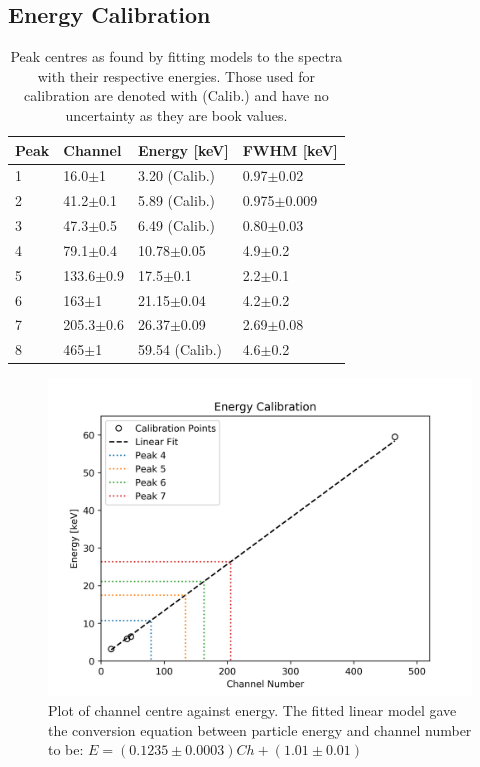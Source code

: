 \subsection{Energy Calibration}

\begin{table}[H]
    \begin{tabular}{llll}
    \hline \hline
    Peak & Channel  & Energy [keV] & FWHM [keV]  \\ \hline
    1    & 16.0$\pm$1    & 3.20 (Calib.)          & 0.97$\pm$0.02   \\
    2    & 41.2$\pm$0.1  & 5.89 (Calib.)        & 0.975$\pm$0.009 \\
    3    & 47.3$\pm$0.5  & 6.49 (Calib.)        & 0.80$\pm$0.03   \\
    4    & 79.1$\pm$0.4  & 10.78$\pm$0.05   & 4.9$\pm$0.2     \\
    5    & 133.6$\pm$0.9 & 17.5$\pm$0.1     & 2.2$\pm$0.1     \\
    6    & 163$\pm$1     & 21.15$\pm$0.04   & 4.2$\pm$0.2     \\
    7    & 205.3$\pm$0.6 & 26.37$\pm$0.09      & 2.69$\pm$0.08   \\
    8    & 465$\pm$1    & 59.54 (Calib.)       & 4.6$\pm$0.2     \\ \hline \hline
    \end{tabular}
    \label{tbl:energyCalibration}
    \caption{Peak centres as found by fitting models to the spectra with their respective energies. Those used for calibration are denoted with (Calib.) and have no uncertainty as they are book values.}
\end{table}

\begin{figure}[H]
  \centering
  \includegraphics[width=\linewidth]{energyCalibration.png}
  \caption{Plot of channel centre against energy. The fitted linear model gave the conversion equation between particle energy and channel number to be: $E = (0.1235\pm0.0003)Ch + (1.01\pm0.01)$}
  \label{fig:energyCalibration}
\end{figure}

